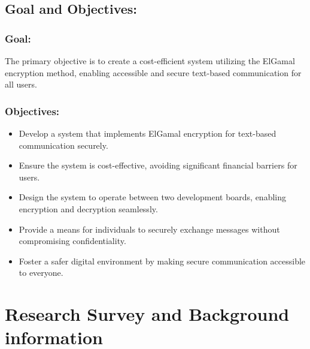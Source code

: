 \documentclass[12pt]{article}
\begin{document}
	\subsection{Goal and Objectives:}
	\subsubsection{Goal:}
	The primary objective is to create a cost-efficient system utilizing the ElGamal encryption method, enabling accessible and secure text-based communication for all users.
	
	\subsubsection{Objectives:}
	\begin{itemize}
		\item Develop a system that implements ElGamal encryption for text-based communication securely.
		\item Ensure the system is cost-effective, avoiding significant financial barriers for users.
		\item Design the system to operate between two development boards, enabling encryption and decryption seamlessly.
		\item Provide a means for individuals to securely exchange messages without compromising confidentiality.
		\item Foster a safer digital environment by making secure communication accessible to everyone.
	\end{itemize}
	\newpage
	\section{Research Survey and Background information}
	
\end{document}
